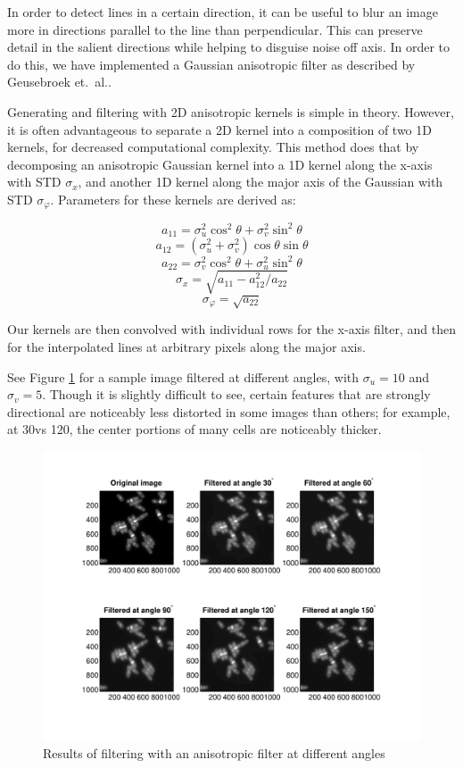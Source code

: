 \documentclass{article}
\begin{document}
In order to detect lines in a certain direction, it can be useful to blur an image more in directions parallel to the line than perpendicular. This can preserve detail in the salient directions while helping to disguise noise off axis. In order to do this, we have implemented a Gaussian anisotropic filter as described by Geusebroek et.\ al.\cite{geusebroek}.

Generating and filtering with 2D anisotropic kernels is simple in theory. However, it is often advantageous to separate a 2D kernel into a composition of two 1D kernels, for decreased computational complexity. This method does that by decomposing an anisotropic Gaussian kernel into a 1D kernel along the x-axis with STD $\sigma_x$, and another 1D kernel along the major axis of the Gaussian with STD $\sigma_\varphi$. Parameters for these kernels are derived as:

\[ a_{11} = \sigma_u^2 \cos^2 \theta + \sigma_v^2 \sin^2 \theta \]
\[ a_{12} = (\sigma_u^2 + \sigma_v^2)\cos\theta \sin\theta \]
\[ a_{22} = \sigma_v^2 \cos^2 \theta + \sigma_u^2 \sin^2 \theta \]
\[ \sigma_x = \sqrt{a_{11} - a_{12}^2/a_{22}} \]
\[ \sigma_\varphi = \sqrt{a_{22}} \]

Our kernels are then convolved with individual rows for the x-axis filter, and then for the interpolated lines at arbitrary pixels along the major axis.

See Figure \ref{fig:anisotropic_filtering} for a sample image filtered at different angles, with $\sigma_u = 10$ and $\sigma_v = 5$. Though it is slightly difficult to see, certain features that are strongly directional are noticeably less distorted in some images than others; for example, at 30\degree vs 120\degree, the center portions of many cells are noticeably thicker.

\begin{figure}[h]
\centering
\includegraphics[width=0.95\linewidth]{figures/anisotropic_filtering.pdf}
\caption{Results of filtering with an anisotropic filter at different angles}
\label{fig:anisotropic_filtering}
\end{figure}
\end{document}
